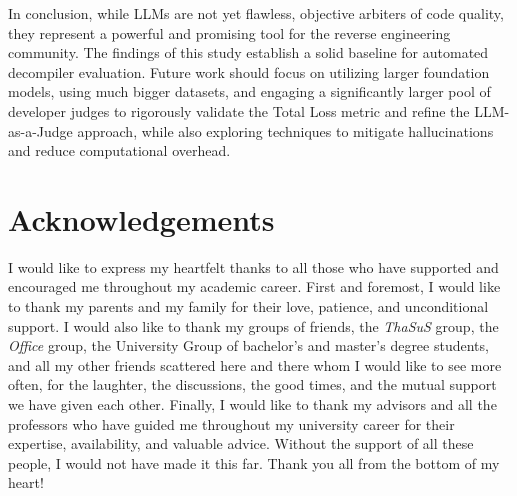 In conclusion, while \acp{LLM} are not yet flawless, objective arbiters of code quality, they represent a powerful and promising tool for the reverse engineering community. 
The findings of this study establish a solid baseline for automated decompiler evaluation. 
Future work should focus on utilizing larger foundation models, using much bigger datasets, and engaging a significantly larger pool of developer judges to rigorously validate the Total Loss metric and refine the LLM-as-a-Judge approach, while also exploring techniques to mitigate hallucinations and reduce computational overhead.

\chapter*{Acknowledgements}

I would like to express my heartfelt thanks to all those who have supported and encouraged me throughout my academic career. First and foremost, I would like to thank my parents and my family for their love, patience, and unconditional support.
I would also like to thank my groups of friends,
the \emph{ThaSuS} group, the \emph{Office} group, the University Group of bachelor's and master's degree students, and all my other friends scattered here and there whom I would like to see more often, for the laughter, the discussions, the good times, and the mutual support we have given each other.
Finally, I would like to thank my advisors and all the professors who have guided me throughout my university career
for their expertise, availability, and valuable advice. Without the support of all these
people, I would not have made it this far. Thank you all from the bottom of my heart!
